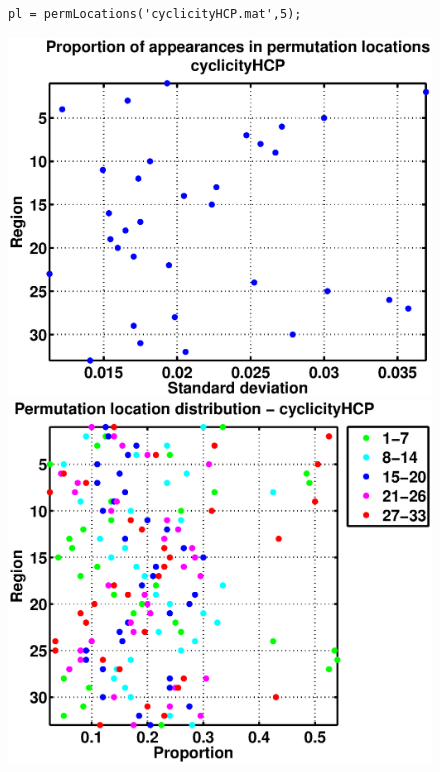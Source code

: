 \documentclass[11pt]{article}
\begin{document}
\newcommand\w{.49}
\begin{figure}
\begin{lstlisting}
pl = permLocations('cyclicityHCP.mat',5);
\end{lstlisting}
\includegraphics[width=\w\linewidth]{figs/cyclicityHCP_permLocationsstd.eps}
\includegraphics[width=\w\linewidth]{figs/cyclicityHCP_permLocationsdots.eps}

\end{figure}
\end{document}
